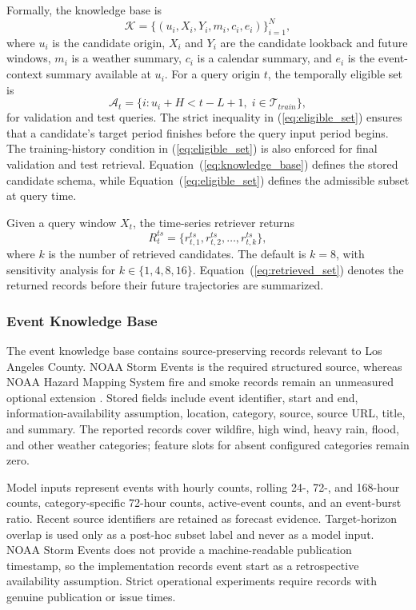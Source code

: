 \documentclass{ieeeaccess}
\begin{document}
Formally, the knowledge base is
\begin{equation}
    \mathcal{K} = \{(u_i, X_i, Y_i, m_i, c_i, e_i)\}_{i=1}^{N},
    \label{eq:knowledge_base}
\end{equation}
where $u_i$ is the candidate origin, $X_i$ and $Y_i$ are the candidate lookback
and future windows, $m_i$ is a weather summary, $c_i$ is a calendar summary, and
$e_i$ is the event-context summary available at $u_i$. For a query origin $t$,
the temporally eligible set is
\begin{equation}
    \mathcal{A}_t =
    \{i: u_i + H < t-L+1,\; i \in \mathcal{T}_{train}\},
    \label{eq:eligible_set}
\end{equation}
for validation and test queries. The strict inequality in
(\ref{eq:eligible_set}) ensures that a candidate's target period finishes before
the query input period begins. The training-history condition in
(\ref{eq:eligible_set}) is also enforced for final validation and test retrieval.
Equation~(\ref{eq:knowledge_base}) defines the stored candidate schema, while
Equation~(\ref{eq:eligible_set}) defines the admissible subset at query time.

Given a query window $X_t$, the time-series retriever returns
\begin{equation}
    R^{ts}_t = \{r^{ts}_{t,1}, r^{ts}_{t,2}, \ldots, r^{ts}_{t,k}\},
    \label{eq:retrieved_set}
\end{equation}
where $k$ is the number of retrieved candidates. The default is $k=8$, with
sensitivity analysis for $k\in\{1,4,8,16\}$.
Equation~(\ref{eq:retrieved_set}) denotes the returned records before their
future trajectories are summarized.

\subsubsection{Event Knowledge Base}
The event knowledge base contains source-preserving records relevant to Los
Angeles County. NOAA Storm Events is the required structured source, whereas
NOAA Hazard Mapping System fire and smoke records remain an unmeasured optional
extension \cite{noaastormevents2026,noaahms2026}. Stored fields include event
identifier, start and end, information-availability assumption, location,
category, source, source URL, title, and summary. The reported records cover
wildfire, high wind, heavy rain, flood, and other weather categories; feature
slots for absent configured categories remain zero.

Model inputs represent events with hourly counts, rolling 24-, 72-, and
168-hour counts, category-specific 72-hour counts, active-event counts, and an
event-burst ratio. Recent source identifiers are retained as forecast
evidence. Target-horizon overlap is used only as a post-hoc subset label and
never as a model input. NOAA Storm Events does not provide a machine-readable
publication timestamp, so the implementation records event start as a
retrospective availability assumption. Strict operational experiments require
records with genuine publication or issue times.
\end{document}
